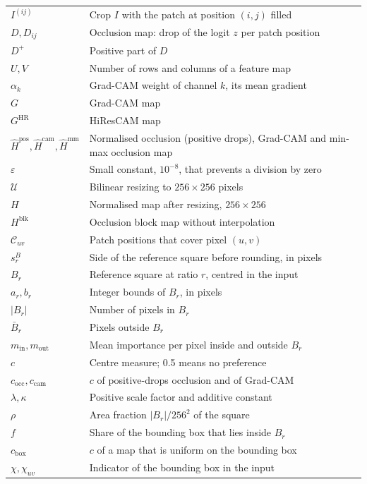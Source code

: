 \begin{longtable}{@{}p{}p{}@{}}
$I^{(ij)}$ & Crop $I$ with the patch at position $(i, j)$ filled \\
$D, D_{ij}$ & Occlusion map: drop of the logit $z$ per patch position \\
$D^+$ & Positive part of $D$ \\
$U, V$ & Number of rows and columns of a feature map \\
$\alpha_k$ & Grad-CAM weight of channel $k$, its mean gradient \\
$G$ & Grad-CAM map \\
$G^{\mathrm{HR}}$ & HiResCAM map \\
$\hat{H}^{\mathrm{pos}}, \hat{H}^{\mathrm{cam}}, \hat{H}^{\mathrm{mm}}$ & Normalised occlusion (positive drops), Grad-CAM and min-max occlusion map \\
$\varepsilon$ & Small constant, $10^{-8}$, that prevents a division by zero \\
$\mathcal{U}$ & Bilinear resizing to $256 \times 256$ pixels \\
$H$ & Normalised map after resizing, $256 \times 256$ \\
$H^{\mathrm{blk}}$ & Occlusion block map without interpolation \\
$\mathcal{C}_{uv}$ & Patch positions that cover pixel $(u, v)$ \\
$s^{B}_{r}$ & Side of the reference square before rounding, in pixels \\
$B_r$ & Reference square at ratio $r$, centred in the input \\
$a_r, b_r$ & Integer bounds of $B_r$, in pixels \\
$|B_r|$ & Number of pixels in $B_r$ \\
$\bar{B}_r$ & Pixels outside $B_r$ \\
$m_{\mathrm{in}}, m_{\mathrm{out}}$ & Mean importance per pixel inside and outside $B_r$ \\
$c$ & Centre measure; 0.5 means no preference \\
$c_{\mathrm{occ}}, c_{\mathrm{cam}}$ & $c$ of positive-drops occlusion and of Grad-CAM \\
$\lambda, \kappa$ & Positive scale factor and additive constant \\
$\rho$ & Area fraction $|B_r|/256^2$ of the square \\
$f$ & Share of the bounding box that lies inside $B_r$ \\
$c_{\mathrm{box}}$ & $c$ of a map that is uniform on the bounding box \\
$\chi, \chi_{uv}$ & Indicator of the bounding box in the input \\

\end{longtable}
